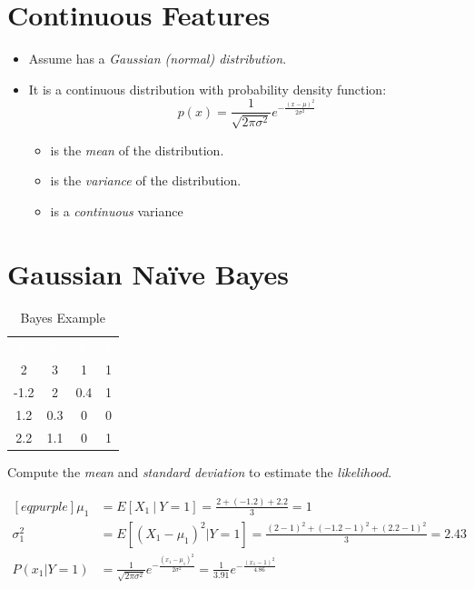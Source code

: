 \documentclass[
	number={3},
	title={Na\"iive Bayes Learning}
]{cs584notes}
\begin{document}
\section{Continuous Features}\label{sec:continuous-features}
\begin{itemize}
	\item Assume  has a \emph{Gaussian (normal) distribution}.
	\item It is a continuous distribution with probability density function:
	\begin{equation}
		p(x) = \frac{1}{\sqrt{2\pi\sigma^{2}}}e^{-\frac{(x - \mu)^{2}}{2\sigma^{2}}}
		\label{eq:gaussian-distribution}
	\end{equation}
	\begin{itemize}
		\item \data{$\mu$} is the \emph{mean} of the distribution.
		\item {} is the \emph{variance} of the distribution.
		\item {} is a \emph{continuous} variance 
	\end{itemize}
\end{itemize}

\section{Gaussian Naïve Bayes}\label{sec:gaussian-naive-bayes}
\begin{table}[H]
	\centering
	\caption{\Naive Bayes Example}
	\label{tab:naive-bayes-Example}
	\begin{tabular}{c c c c}
		\rowcolor{darkgreen} \textcolor{white}{$X_{1}$} & \textcolor{white}{$X_{2}$} & \textcolor{white}{$X_{3}$} & \textcolor{white}{$Y$}\\
		2 & 3 & 1 & 1\\
		-1.2 & 2 & 0.4 & 1\\
		1.2 & 0.3 & 0 & 0\\
		2.2 & 1.1 & 0 & 1
	\end{tabular}
\end{table}


Compute the \emph{mean} and \emph{standard deviation} to estimate the \emph{likelihood}.

\begin{equation*}
	\begin{aligned}[eqpurple]
		\mu_{1} &= E[X_{1}\ |\ Y = 1] = \frac{2 + (-1.2)  + 2.2}{3} = 1\\
		\sigma_{1}^{2} &= E\left[ (X_{1} - \mu_{1})^{2} | Y = 1 \right] = \frac{(2-1)^{2} + (-1.2 - 1)^{2} + (2.2 - 1)^{2}}{3} = 2.43\\
		P(x_{1} | Y=1 ) &= \frac{1}{\sqrt{2\pi\sigma^{2}}}e^{-\frac{(x_{1} - \mu_{1})^{2}}{2\sigma^{2}}} = \frac{1}{3.91}e^{-\frac{(x_{1} - 1)^{2}}{4.86}}
	\end{aligned}
\end{equation*}
\end{document}
